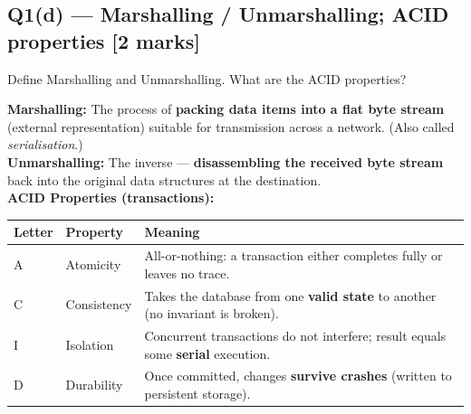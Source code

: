\documentclass[12pt, a4paper]{article}
\newenvironment{qbox}{\begin{mdframed}[style=qframe]}{\end{mdframed}}
\newenvironment{solbox}{\begin{mdframed}[style=solframe]}{\end{mdframed}}
\newcommand{\qmarks}[1]{\hfill\textbf{\color{orange!70!black}[#1 marks]}}
\begin{document}
\subsection{Q1(d) — Marshalling / Unmarshalling; ACID properties \texorpdfstring{\qmarks{2}}{}}
\begin{qbox}Define Marshalling and Unmarshalling. What are the ACID properties?\end{qbox}
\begin{solbox}
\textbf{Marshalling:} The process of \textbf{packing data items into a flat byte stream} (external representation) suitable for transmission across a network. (Also called \emph{serialisation}.)\\[3pt]
\textbf{Unmarshalling:} The inverse — \textbf{disassembling the received byte stream} back into the original data structures at the destination.\\[6pt]
\textbf{ACID Properties (transactions):}
\begin{center}\renewcommand{\arraystretch}{1.25}
\begin{tabularx}{\linewidth}{l l X}
\toprule
\textbf{Letter} & \textbf{Property} & \textbf{Meaning} \\
\midrule
A & Atomicity & All-or-nothing: a transaction either completes fully or leaves no trace. \\
C & Consistency & Takes the database from one \textbf{valid state} to another (no invariant is broken). \\
I & Isolation & Concurrent transactions do not interfere; result equals some \textbf{serial} execution. \\
D & Durability & Once committed, changes \textbf{survive crashes} (written to persistent storage). \\
\bottomrule
\end{tabularx}\end{center}
\end{solbox}

\end{document}
